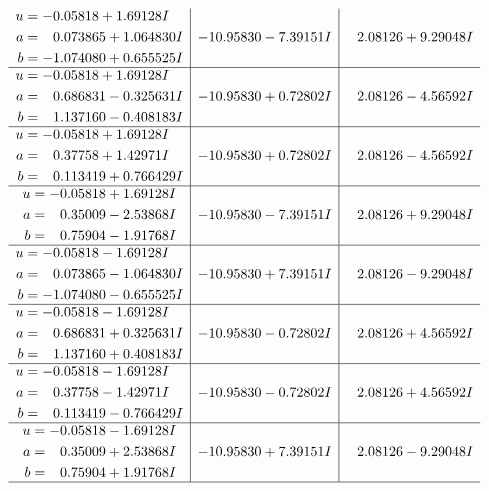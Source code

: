 \documentclass[1p]{elsarticle_modified}
\theoremstyle{definition}
\begin{document}
$$\begin{array}{c|c|c}
\begin{aligned}
u &= -0.05818 + 1.69128 I \\
a &= \phantom{-}0.073865 + 1.064830 I \\
b &= -1.074080 + 0.655525 I\end{aligned}
 & -10.95830 - 7.39151 I & \phantom{-}2.08126 + 9.29048 I \\ \hline\begin{aligned}
u &= -0.05818 + 1.69128 I \\
a &= \phantom{-}0.686831 - 0.325631 I \\
b &= \phantom{-}1.137160 - 0.408183 I\end{aligned}
 & -10.95830 + 0.72802 I & \phantom{-}2.08126 - 4.56592 I \\ \hline\begin{aligned}
u &= -0.05818 + 1.69128 I \\
a &= \phantom{-}0.37758 + 1.42971 I \\
b &= \phantom{-}0.113419 + 0.766429 I\end{aligned}
 & -10.95830 + 0.72802 I & \phantom{-}2.08126 - 4.56592 I \\ \hline\begin{aligned}
u &= -0.05818 + 1.69128 I \\
a &= \phantom{-}0.35009 - 2.53868 I \\
b &= \phantom{-}0.75904 - 1.91768 I\end{aligned}
 & -10.95830 - 7.39151 I & \phantom{-}2.08126 + 9.29048 I \\ \hline\begin{aligned}
u &= -0.05818 - 1.69128 I \\
a &= \phantom{-}0.073865 - 1.064830 I \\
b &= -1.074080 - 0.655525 I\end{aligned}
 & -10.95830 + 7.39151 I & \phantom{-}2.08126 - 9.29048 I \\ \hline\begin{aligned}
u &= -0.05818 - 1.69128 I \\
a &= \phantom{-}0.686831 + 0.325631 I \\
b &= \phantom{-}1.137160 + 0.408183 I\end{aligned}
 & -10.95830 - 0.72802 I & \phantom{-}2.08126 + 4.56592 I \\ \hline\begin{aligned}
u &= -0.05818 - 1.69128 I \\
a &= \phantom{-}0.37758 - 1.42971 I \\
b &= \phantom{-}0.113419 - 0.766429 I\end{aligned}
 & -10.95830 - 0.72802 I & \phantom{-}2.08126 + 4.56592 I \\ \hline\begin{aligned}
u &= -0.05818 - 1.69128 I \\
a &= \phantom{-}0.35009 + 2.53868 I \\
b &= \phantom{-}0.75904 + 1.91768 I\end{aligned}
 & -10.95830 + 7.39151 I & \phantom{-}2.08126 - 9.29048 I\\
 \hline 
 \end{array}$$\newpage\newpage\renewcommand{\arraystretch}{1}
\end{document}
